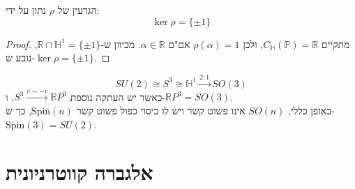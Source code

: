 \documentclass{tstextbook}
\begin{document}
\begin{proposition}
הגרעין של \(\rho\) נתון על ידי:
$$\ker \rho=\{ \pm 1 \}$$

\end{proposition}
\begin{proof}
מתקיים \(C_{\mathbb{H} }(\mathbb{P} )=\mathbb{R}\), ולכן \(\rho(\alpha)=1\) אם"ם \(\alpha \in \mathbb{R}\).  מכיוון ש-\(\mathbb{R}\cap \mathbb{H}^{1}=\{ \pm 1 \}\), נובע ש-\(\ker \rho=\{ \pm 1 \}\).

\end{proof}
\begin{proposition}
$$SU(2)\cong S^{3}\cong \mathbb{H} ^{1}\xrightarrow{2:1} SO(3)$$
כאשר יש העתקה נוספת \(S^{3}\xrightarrow{v\sim  -v}\mathbb{R}P^{3}\), ו-\(\mathbb{R}P^{3}=SO(3)\).\\

באופן כללי, \(SO(n)\) אינו פשוט קשר ויש לו כיסוי כפול פשוט קשר \(\text{Spin}(n)\), כך ש-\(\text{Spin}(3)=SU(2)\).

\end{proposition}
\section{אלגברה קווטרניונית}
\end{document}
